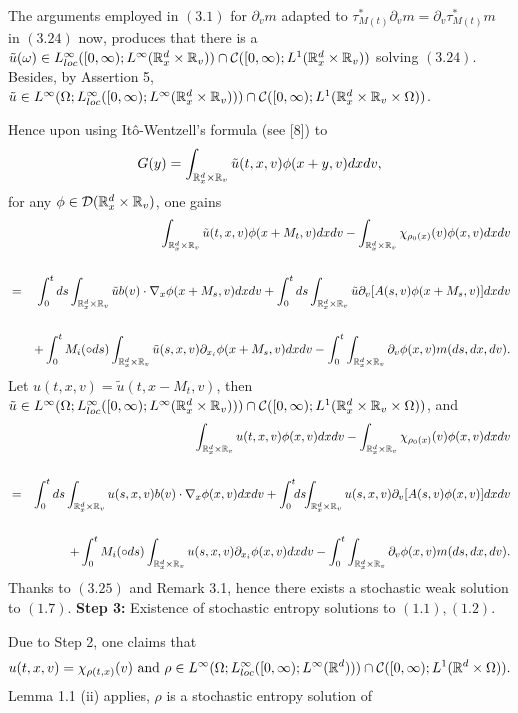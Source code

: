 \documentclass[11pt]{article}
\begin{document}
 \vskip1mm\par
The arguments employed in $(3.1)$ for $\partial_vm$ adapted to
$\tau^{*}_{M(t)}\partial_vm=\partial_v\tau^{*}_{M(t)}m$ in $(3.24)$
now, produces that there is a $\tilde{u}(\omega)\in
L^\infty_{loc}([0,\infty);L^\infty({\mathbb R}^d_x\times{\mathbb R}_v))\cap
{\mathcal C}([0,\infty);L^1({\mathbb R}^d_x\times{\mathbb R}_v))$ solving $(3.24)$. Besides,
by Assertion 5, $\tilde{u}\in
L^\infty(\Omega;L^\infty_{loc}([0,\infty);L^\infty(
{\mathbb R}^d_x\times{\mathbb R}_v)))\cap
{\mathcal C}([0,\infty);L^1({\mathbb R}^d_x\times{\mathbb R}_v\times \Omega))$.
   \vskip1mm\par
Hence upon using It\^{o}-Wentzell's formula (see [8]) to
$$
G(y)=\int_{{\mathbb R}^d_x\times{\mathbb R}_v}\tilde{u}(t,x,v)\phi(x+y,v)dxdv,
$$
for any $\phi\in {\mathcal D}({\mathbb R}^d_x\times{\mathbb R}_v)$, one gains
\begin{eqnarray*}
&&\int_{{\mathbb R}^d_x\times {\mathbb R}_v}\tilde{u}(t,x,v)\phi(x+M_t,v)dxdv
-\int_{{\mathbb R}^d_x\times {\mathbb R}_v}\chi_{\rho_0(x)}(v)\phi(x,v)dxdv \cr
\cr&=& \int_{0}^{t}ds\int_{{\mathbb R}^d_x\times {\mathbb R}_v}\tilde{u}
b(v)\cdot\nabla_x
\phi(x+M_s,v)dxdv+\int_{0}^{t}ds\int_{{\mathbb R}^d_x\times {\mathbb R}_v}\tilde{u}
\partial_v[A(s,v)\phi(x+M_s,v)]dxdv \cr \cr &&  +
\int_0^tM_i(\circ ds)\int_{{\mathbb R}^d_x\times {\mathbb R}_v}
\tilde{u}(s,x,v)\partial_{x_i}\phi(x+M_s,v)dxdv -
\int_0^t\int_{{\mathbb R}^d_x\times {\mathbb R}_v}\partial_v\phi(x,v) m(ds,dx,dv).
\end{eqnarray*}
Let $u(t,x,v)=\tilde{u}(t,x-M_t,v)$, then $\tilde{u} \in
L^\infty(\Omega;L^\infty_{loc}([0,\infty);L^\infty(
{\mathbb R}^d_x\times{\mathbb R}_v)))\cap
{\mathcal C}([0,\infty);L^1({\mathbb R}^d_x\times{\mathbb R}_v\times \Omega))$, and
\begin{eqnarray}\label{3.25}
&&\int_{{\mathbb R}^d_x\times {\mathbb R}_v}u(t,x,v)\phi(x,v)dxdv
-\int_{{\mathbb R}^d_x\times {\mathbb R}_v}\chi_{\rho_0(x)}(v)\phi(x,v)dxdv \cr
\cr&=& \int_{0}^{t}ds\int_{{\mathbb R}^d_x\times {\mathbb R}_v}u(s,x,v)
b(v)\cdot\nabla_x
\phi(x,v)dxdv+\int_{0}^{t}\!\!ds\!\!\int_{{\mathbb R}^d_x\times
{\mathbb R}_v}u(s,x,v)
\partial_v[A(s,v)\phi(x,v)]dxdv \cr \cr && +\int_0^t
M_i(\circ ds)\int_{{\mathbb R}^d_x\times
{\mathbb R}_v}u(s,x,v)\partial_{x_i}\phi(x,v)dxdv-
\int_0^t\int_{{\mathbb R}^d_x\times {\mathbb R}_v}\partial_v\phi(x,v) m(ds,dx,dv).
\end{eqnarray}
Thanks to $(3.25)$ and Remark 3.1, hence there exists a stochastic
weak solution to $(1.7)$.
   \vskip2mm\noindent
\textbf{Step 3:} Existence of stochastic entropy solutions to
$(1.1), (1.2)$.
   \vskip1mm\par
Due to Step 2, one claims that
$$
u(t,x,v)=\chi_{\rho(t,x)}(v) \ \mbox{and}  \ \rho\in
L^\infty(\Omega; L^\infty_{loc}([0,\infty);L^\infty(\mR^d)))\cap
\cC([0,\infty);L^1(\mR^d\times \Omega)).
$$
Lemma 1.1 (ii) applies, $\rho$ is a stochastic entropy solution of
\end{document}
